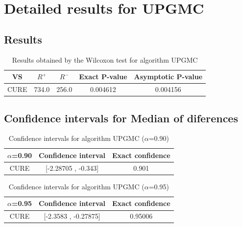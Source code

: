 \documentclass[a4paper,10pt]{article}
\begin{document}
 \clearpage 


\section{Detailed results for UPGMC}


\subsection{Results}

\begin{table}[!htp]
\centering\small
\begin{tabular}{
|c|c|c|c|c|}
\hline
 VS & $R^{+}$ & $R^{-}$ & Exact P-value & Asymptotic P-value \\ \hline 
CURE & 734.0 & 256.0 & 0.004612 & 0.004156\\ \hline 

\end{tabular}
\caption{Results obtained by the Wilcoxon test for algorithm UPGMC}
\end{table}

\subsection{Confidence intervals for Median of diferences}

\begin{table}[!htp]
\centering\small
\begin{tabular}{
|c|c|c|}
\hline
 $\alpha$=0.90 & Confidence interval & Exact confidence \\ \hline 
CURE & [-2.28705 , -0.343] & 0.901\\ \hline 

\end{tabular}
\caption{Confidence intervals for algorithm UPGMC ($\alpha$=0.90)}
\end{table}
\begin{table}[!htp]
\centering\small
\begin{tabular}{
|c|c|c|}
\hline
 $\alpha$=0.95 & Confidence interval & Exact confidence \\ \hline 
CURE & [-2.3583 , -0.27875] & 0.95006\\ \hline 

\end{tabular}
\caption{Confidence intervals for algorithm UPGMC ($\alpha$=0.95)}
\end{table}

 \clearpage 
\end{document}
